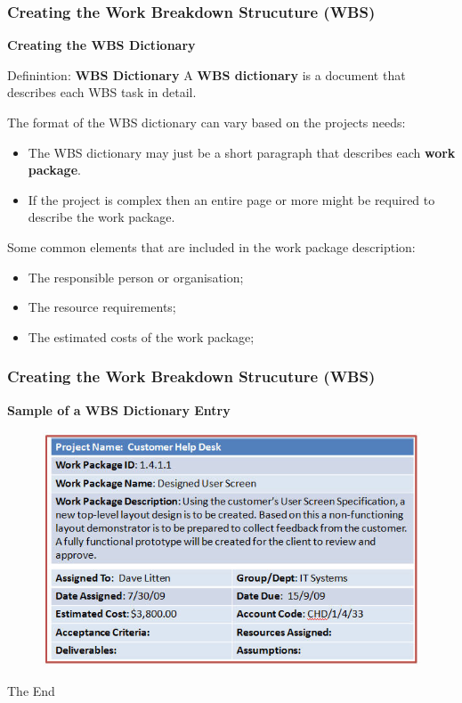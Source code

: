 \documentclass[aspectratio=169]{beamer}
\begin{document}
\begin{frame}
\frametitle{Creating the Work Breakdown Strucuture (WBS)}
\textbf{Creating the WBS Dictionary}
\vspace{0.25cm}
\begin{block}{Definintion: \textbf{WBS Dictionary}}
A \textbf{WBS dictionary} is a document that describes each WBS task in detail.
\end{block}
\vspace{0.25cm}
The format of the WBS dictionary can vary based on the projects needs:
\begin{itemize}
\item The WBS dictionary may just be a short paragraph that describes each \textbf{work package}.
\item If the project is complex then an entire page or more might be required to describe the work package.
\end{itemize}
\vspace{0.2cm}
Some common elements that are included in the work package description:
\vspace{-0.1cm}
\begin{itemize}
\item The responsible person or organisation;
\item The resource requirements;
\item The estimated costs of the work package;
\end{itemize}
\end{frame}


\begin{frame}
\frametitle{Creating the Work Breakdown Strucuture (WBS)}
\textbf{Sample of a WBS Dictionary Entry}
\vspace{0.5cm}
\begin{figure}
\includegraphics[scale=0.5]{wbsdictionary}
\end{figure}
\end{frame}


\begin{frame}
\begin{center}
\huge The End
\end{center}
\end{frame}
\end{document}
